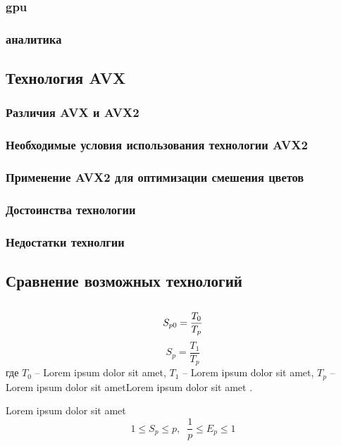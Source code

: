 \subsubsection{gpu}
\subsubsection{аналитика}
\subsection{Технология AVX}
\subsubsection{Различия AVX и AVX2}
\subsubsection{Необходимые условия использования технологии AVX2}
\subsubsection{Применение AVX2 для оптимизации смешения цветов}
\subsubsection{Достоинства технологии}
\subsubsection{Недостатки технолгии}
\subsection{Сравнение возможных технологий}
\subsection{}



\begin{equation}
S_{p0}=\frac{T_{0} }{T_{p}} \\
\label{F:100}
\end{equation}
\begin{equation}
S_{p}=\frac{T_{1} }{T_{p}}
\label{F:101}
\end{equation}
где $T_{0}$ -- Lorem ipsum dolor sit amet, $T_{1}$ -- Lorem ipsum dolor sit amet, $T_{p}$ -- Lorem ipsum dolor sit ametLorem ipsum dolor sit amet . 

Lorem ipsum dolor sit amet
\begin{equation}
1\leq S_{p} \leq p,\; \;  \frac{1}{p} \leq E_{p} \leq 1
\label{F:103}
\end{equation}





